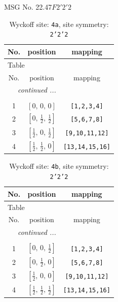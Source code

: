 \documentclass[fleqn,8pt]{jsarticle}
\begin{document}
\setcounter{MaxMatrixCols}{32}

\renewcommand{\tablename}{Table~}
\renewcommand{\figurename}{Figure~}
\begin{center}
\LARGE
MSG No. 22.47\quad$F2'2'2$
\end{center}
\renewcommand{\arraystretch}{1.2}
\begin{longtable}{ccc}
\caption{Wyckoff site: {\tt 4a}, site symmetry: {\tt 2'2'2}}
 \\
 \hline \hline
No. & position & mapping \\ \hline \endfirsthead

\multicolumn{2}{l}{\tablename\ \thetable{}} \\
 \hline \hline
No. & position & mapping \\ \hline \endhead

 \hline \hline
\multicolumn{2}{r}{\footnotesize\it continued ...} \\ \endfoot

 \hline \hline
\multicolumn{2}{r}{} \\ \endlastfoot

1 & $\left[ 0,\, 0,\, 0 \right]$ & {\tt [1,2,3,4]} \\ \hline
2 & $\left[ 0,\, \frac{1}{2},\, \frac{1}{2} \right]$ & {\tt [5,6,7,8]} \\ \hline
3 & $\left[ \frac{1}{2},\, 0,\, \frac{1}{2} \right]$ & {\tt [9,10,11,12]} \\ \hline
4 & $\left[ \frac{1}{2},\, \frac{1}{2},\, 0 \right]$ & {\tt [13,14,15,16]} \\
\end{longtable}
\renewcommand{\arraystretch}{1.2}
\begin{longtable}{ccc}
\caption{Wyckoff site: {\tt 4b}, site symmetry: {\tt 2'2'2}}
 \\
 \hline \hline
No. & position & mapping \\ \hline \endfirsthead

\multicolumn{2}{l}{\tablename\ \thetable{}} \\
 \hline \hline
No. & position & mapping \\ \hline \endhead

 \hline \hline
\multicolumn{2}{r}{\footnotesize\it continued ...} \\ \endfoot

 \hline \hline
\multicolumn{2}{r}{} \\ \endlastfoot

1 & $\left[ 0,\, 0,\, \frac{1}{2} \right]$ & {\tt [1,2,3,4]} \\ \hline
2 & $\left[ 0,\, \frac{1}{2},\, 0 \right]$ & {\tt [5,6,7,8]} \\ \hline
3 & $\left[ \frac{1}{2},\, 0,\, 0 \right]$ & {\tt [9,10,11,12]} \\ \hline
4 & $\left[ \frac{1}{2},\, \frac{1}{2},\, \frac{1}{2} \right]$ & {\tt [13,14,15,16]} \\
\end{longtable}
\end{document}
